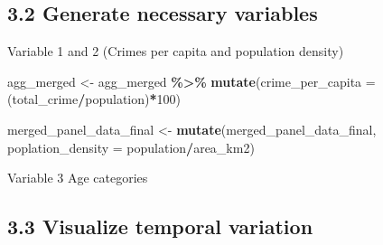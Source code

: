 \documentclass[
]{article}
\newenvironment{Shaded}{\begin{snugshade}}{\end{snugshade}}
\newcommand{\AttributeTok}[1]{\textcolor[rgb]{0.13,0.29,0.53}{#1}}
\newcommand{\DecValTok}[1]{\textcolor[rgb]{0.00,0.00,0.81}{#1}}
\newcommand{\FunctionTok}[1]{\textcolor[rgb]{0.13,0.29,0.53}{\textbf{#1}}}
\newcommand{\NormalTok}[1]{#1}
\newcommand{\OtherTok}[1]{\textcolor[rgb]{0.56,0.35,0.01}{#1}}
\newcommand{\SpecialCharTok}[1]{\textcolor[rgb]{0.81,0.36,0.00}{\textbf{#1}}}
\newcommand{\StringTok}[1]{\textcolor[rgb]{0.31,0.60,0.02}{#1}}
\begin{document}
\subsection{3.2 Generate necessary
variables}\label{generate-necessary-variables}

Variable 1 and 2 (Crimes per capita and population density)

\begin{Shaded}
\begin{Highlighting}[]
\NormalTok{agg\_merged }\OtherTok{\textless{}{-}}\NormalTok{ agg\_merged }\SpecialCharTok{\%\textgreater{}\%}
  \FunctionTok{mutate}\NormalTok{(}\AttributeTok{crime\_per\_capita =}\NormalTok{ (total\_crime}\SpecialCharTok{/}\NormalTok{population)}\SpecialCharTok{*}\DecValTok{100}\NormalTok{)}

\NormalTok{merged\_panel\_data\_final }\OtherTok{\textless{}{-}} \FunctionTok{mutate}\NormalTok{(merged\_panel\_data\_final, }\AttributeTok{poplation\_density =}\NormalTok{ population}\SpecialCharTok{/}\NormalTok{area\_km2)}
\end{Highlighting}
\end{Shaded}

Variable 3 Age categories

\begin{Shaded}
\end{Shaded}

\subsection{3.3 Visualize temporal
variation}\label{visualize-temporal-variation}
\end{document}
